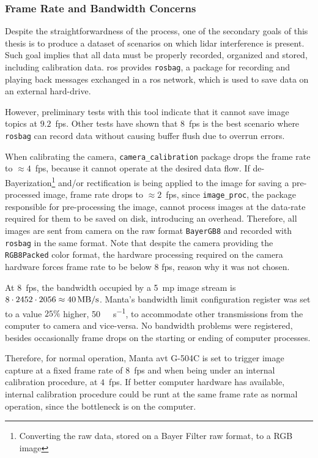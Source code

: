 \subsubsection{Frame Rate and Bandwidth Concerns}
Despite the straightforwardness of the process, one of the secondary goals of this thesis is to produce a dataset of scenarios on which \ac{lidar} interference is present. Such goal implies that all data must be properly recorded, organized and stored, including calibration data. \ac{ros} provides \texttt{rosbag}, a package for recording and playing back messages exchanged in a \ac{ros} network, which is used to save data on an external hard-drive.

However, preliminary tests with this tool indicate that it cannot save image topics at $9.2$~\ac{fps}. Other tests have shown that $8$~\ac{fps} is the best scenario where \texttt{rosbag} can record data without causing buffer flush due to overrun errors. 

When calibrating the camera, \texttt{camera\_calibration} package drops the frame rate to $\approx 4$~\ac{fps}, because it cannot operate at the desired data flow. If de-Bayerization\footnote{Converting the raw data, stored on a Bayer Filter raw format, to a RGB image} and/or rectification is being applied to the image for saving a pre-processed image, frame rate drops to $\approx 2$~\ac{fps}, since \texttt{image\_proc}, the package responsible for pre-processing the image, cannot process images at the data-rate required for them to be saved on disk, introducing an overhead. Therefore, all images are sent from camera on the raw format \texttt{BayerGB8} and recorded with \texttt{rosbag} in the same format. Note that despite the camera providing  the \texttt{RGB8Packed} color format, the hardware processing required on the camera hardware forces frame rate to be below $8$ \ac{fps}, reason why it was not chosen.

At 8~\ac{fps}, the bandwidth occupied by a 5~\ac{mp} image stream is $8 \cdot 2452 \cdot 2056 \approx \SI[per-mode=symbol]{40}{\mega\byte\per\second}$. Manta's bandwidth limit configuration register was set to a value $25\%$ higher, \SI[per-mode=symbol]{50}{\mega\byte\per\second}, to accommodate other transmissions from the computer to camera and vice-versa. No bandwidth problems were registered, besides occasionally frame drops on the starting or ending of computer processes.

Therefore, for normal operation, Manta \ac{avt} G-504C is set to trigger image capture at a fixed frame rate of $8$~\ac{fps} and when being under an internal calibration procedure, at $4$~\ac{fps}. If better computer hardware has available, internal calibration procedure could be runt at the same frame rate as normal operation, since the bottleneck is on the computer.

